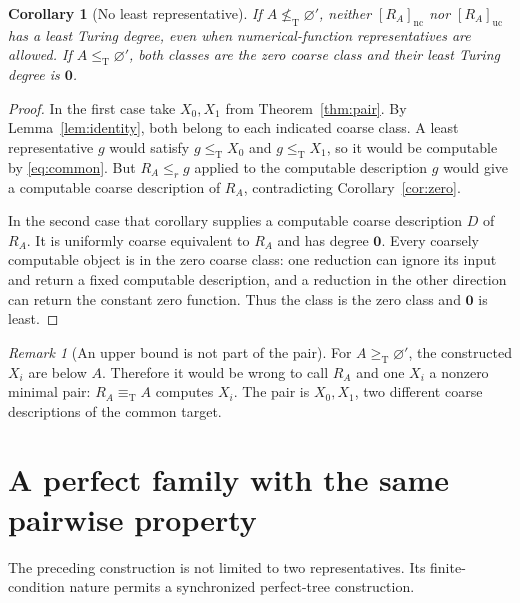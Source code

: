 \documentclass[11pt,a4paper]{article}
\newcommand{\leT}{\leq_{\mathrm T}}
\newcommand{\geT}{\geq_{\mathrm T}}
\newcommand{\nleT}{\nleq_{\mathrm T}}
\newcommand{\eqT}{\equiv_{\mathrm T}}
\newcommand{\nc}{\mathrm{nc}}
\newcommand{\uc}{\mathrm{uc}}
\newcommand{\zero}{\mathbf 0}
\newtheorem{corollary}[theorem]{Corollary}
\theoremstyle{definition}\newtheorem{definition}[theorem]{Definition}
\theoremstyle{remark}\newtheorem{remark}[theorem]{Remark}
\begin{document}
\begin{corollary}[No least representative]\label{cor:noleast}
If $A\nleT\varnothing'$, neither $[R_A]_\nc$ nor $[R_A]_\uc$ has a least Turing degree, even when numerical-function representatives are allowed. If $A\leT\varnothing'$, both classes are the zero coarse class and their least Turing degree is $\zero$.
\end{corollary}
\begin{proof}
In the first case take $X_0,X_1$ from Theorem~\ref{thm:pair}. By Lemma~\ref{lem:identity}, both belong to each indicated coarse class. A least representative $g$ would satisfy $g\leT X_0$ and $g\leT X_1$, so it would be computable by \eqref{eq:common}. But $R_A\leq_r g$ applied to the computable description $g$ would give a computable coarse description of $R_A$, contradicting Corollary~\ref{cor:zero}.

In the second case that corollary supplies a computable coarse description $D$ of $R_A$. It is uniformly coarse equivalent to $R_A$ and has degree $\zero$. Every coarsely computable object is in the zero coarse class: one reduction can ignore its input and return a fixed computable description, and a reduction in the other direction can return the constant zero function. Thus the class is the zero class and $\zero$ is least.
\end{proof}

\begin{remark}[An upper bound is not part of the pair]
For $A\geT\varnothing'$, the constructed $X_i$ are below $A$. Therefore it would be wrong to call $R_A$ and one $X_i$ a nonzero minimal pair: $R_A\eqT A$ computes $X_i$. The pair is $X_0,X_1$, two different coarse descriptions of the common target.
\end{remark}

\section{A perfect family with the same pairwise property}
\label{sec:perfect}
The preceding construction is not limited to two representatives. Its finite-condition nature permits a synchronized perfect-tree construction.
\end{document}
